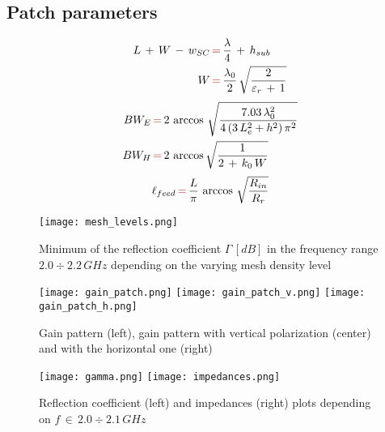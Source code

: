 \documentclass[12pt,a4paper]{article}
\begin{document}
{\subsection*{Patch parameters}
\begin{equation}\begin{aligned}L\,+\,W\,-\,w_{SC}\,&{\color{Mahogany}=}\,\frac{\lambda}{4}\,+\,h_{sub}\\
W\,&{\color{Mahogany}=}\,\frac{\lambda_0}{2}\,\sqrt{\frac{2}{\varepsilon_r\,+\,1}}\\
\end{aligned}
\end{equation}
\begin{equation}
\begin{aligned}
BW_E\,&{\color{Mahogany}=}\,2\,\arccos\,\sqrt{\frac{7.03\,\lambda_0^2}{4\,(3\,L_e^2+h^2)\,\pi^2}}\\
BW_H\,&{\color{Mahogany}=}\,2\,\arccos\sqrt{\frac{1}{2\,+\,k_0\,W}}\\
\end{aligned}
\end{equation}
\begin{equation}
\ell_{feed}\,{\color{Mahogany}=}\,\frac{L}{\pi}\,\arccos\,\sqrt{\frac{R_{in}}{R_r}}
\end{equation}
\begin{center}
	\begin{figure}[h]
		\texttt{[image: mesh\_levels.png]}
		\caption{{Minimum of the reflection coefficient $\Gamma\, [dB]$ in the frequency range $2.0\div 2.2\,GHz$ depending on the varying mesh density level}}
	\end{figure}
\end{center}
\begin{center}
\begin{figure}
\texttt{[image: gain\_patch.png]}
\texttt{[image: gain\_patch\_v.png]}
\texttt{[image: gain\_patch\_h.png]}
\caption{Gain pattern (left), gain pattern with vertical polarization (center) and with the horizontal one (right)}
\end{figure}
\end{center}
\begin{center}
\begin{figure}
\texttt{[image: gamma.png]}
\texttt{[image: impedances.png]}
\caption{Reflection coefficient (left) and impedances (right) plots depending on $f\,\in\,2.0\div 2.1\,GHz$}
\end{figure}
\end{center}
}
\end{document}

